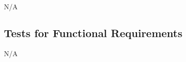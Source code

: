\documentclass[12pt, titlepage]{article}
\begin{document}
N/A


\subsection{Tests for Functional Requirements}

N/A






					
					
					


					

					
\end{document}
